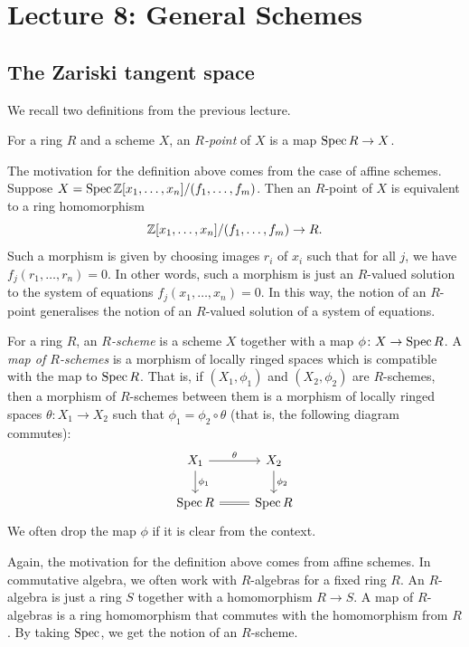 \newpage

\section*{Lecture 8: General Schemes}

\subsection{The Zariski tangent space}

We recall two definitions from the previous lecture.

\begin{definition}
For a ring $R$ and a scheme $X$, an \emph{$R$-point} of $X$ is a map $\operatorname{Spec} R \to X$.
\end{definition}

The motivation for the definition above comes from the case of affine schemes.
Suppose \(X = \operatorname{Spec} \mathbb{Z}[x_1,\dots,x_n]/(f_1,\dots,f_m)\).
Then an \(R\)-point of \(X\) is equivalent to a ring homomorphism
\[ \mathbb{Z}[x_1,\dots,x_n]/(f_1,\dots,f_m) \to R.\]
Such a morphism is given by choosing images \(r_i\) of \(x_i\) such that for all \(j\), we have \(f_j(r_1,\dots,r_n) = 0\).
In other words, such a morphism is just an \(R\)-valued solution to the system of equations \(f_j(x_1,\dots,x_n) = 0\).
In this way, the notion of an \(R\)-point generalises the notion of an \(R\)-valued solution of a system of equations.

\begin{definition}
  For a ring $R$, an \emph{$R$-scheme} is a scheme \(X\) together with a map $\phi \colon X \to \operatorname{Spec} R$.
  A \emph{map of $R$-schemes} is a morphism of locally ringed spaces which is compatible with the map to $\operatorname{Spec} R$.
  That is, if $(X_1,\phi_1)$ and $(X_2,\phi_2)$ are $R$-schemes, then a morphism of \(R\)-schemes between them is a morphism of locally ringed spaces $\theta : X_1 \to X_2$ such that $\phi_1 = \phi_2 \circ \theta$ (that is, the following diagram commutes):
  \[
    \begin{tikzcd}
      X_1\ar{r}{\theta}\ar{d}{\phi_1} & X_2 \ar{d}{\phi_2}\\
      \Spec R \ar[equal]{r}& \Spec R
    \end{tikzcd}
  \]
  We often drop the map \(\phi\) if it is clear from the context.
  \end{definition}
  
  
  Again, the motivation for the definition above comes from affine schemes.
  In commutative algebra, we often work with \(R\)-algebras for a fixed ring \(R\).
  An \(R\)-algebra is just a ring \(S\) together with a homomorphism \(R \to S\).
  A map of \(R\)-algebras is a ring homomorphism that commutes with the homomorphism from \(R\).
  By taking \(\operatorname{Spec}\), we get the notion of an \(R\)-scheme.


